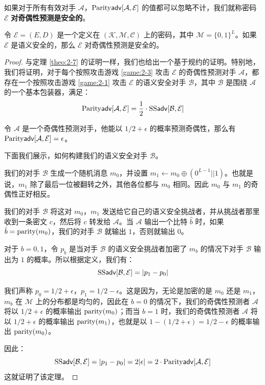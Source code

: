\begin{definition}[奇偶性预测]
如果对于所有有效对手 $\mathcal{A}$，${\rm Parity\mathsf{adv}}[\mathcal{A},\mathcal{E}]$ 的值都可以忽略不计，我们就称密码 $\mathcal{E}$ \textbf{对奇偶性预测是安全的}。
\end{definition}

\begin{theorem}
令 $\mathcal{E}=(E,D)$ 是一个定义在 $(\mathcal{K},\mathcal{M},\mathcal{C})$ 上的密码，其中 $\mathcal{M}=\{0,1\}^L$。如果 $\mathcal{E}$ 是语义安全的，那么 $\mathcal{E}$ 对奇偶性预测是安全的。
\end{theorem}

\begin{proof}
与定理 \ref{theo:2-7} 的证明一样，我们也给出一个基于规约的证明。特别地，我们将证明，对于每个按照攻击游戏 \ref{game:2-3} 攻击 $\mathcal{E}$ 的奇偶性预测对手 $\mathcal{A}$，都存在一个按照攻击游戏 \ref{game:2-1} 攻击 $\mathcal{E}$ 的语义安全对手 $\mathcal{B}$，其中 $\mathcal{B}$ 是围绕 $\mathcal{A}$ 的一个基本包装器，满足：
$$
{\rm Parity\mathsf{adv}}[\mathcal{A},\mathcal{E}]=\frac{1}{2}\cdot{\rm SS\mathsf{adv}}[\mathcal{B},\mathcal{E}]
$$

令 $\mathcal{A}$ 是一个奇偶性预测对手，他能以 ${1}/{2}+\epsilon$ 的概率预测奇偶性，那么有 ${\rm Parity\mathsf{adv}}[\mathcal{A},\mathcal{E}]=\epsilon$。

下面我们展示，如何构建我们的语义安全对手 $\mathcal{B}$。

我们的对手 $\mathcal{B}$ 生成一个随机消息 $m_0$，并设置 $m_1\leftarrow m_0\oplus(0^{L-1}||1)$。也就是说，$m_1$ 除了最后一位被翻转之外，其他各位都与 $m_0$ 相同。因此 $m_0$ 与 $m_1$ 的奇偶性正好相反。

我们的对手 $\mathcal{B}$ 将这对 $m_0$，$m_1$ 发送给它自己的语义安全挑战者，并从挑战者那里收到一条密文 $c$，然后将 $c$ 转发给 $\mathcal{A}$。当 $\mathcal{A}$ 输出一个比特 $\hat b$ 时，如果 $\hat b={\rm parity}(m_0)$，我们的对手 $\mathcal{B}$ 就输出 $1$，否则就输出 $0$。

对于 $b=0,1$，令 $p_b$ 是当对手 $\mathcal{B}$ 的语义安全挑战者加密了 $m_b$ 的情况下对手 $\mathcal{B}$ 输出为 $1$ 的概率。所以根据定义，我们有：
$$
{\rm SS\mathsf{adv}}[\mathcal{B},\mathcal{E}]=|p_1-p_0|
$$

我们声称 $p_0={1}/{2}+\epsilon$，$p_1={1}/{2}-\epsilon$。这是因为，无论是加密的是 $m_0$ 还是 $m_1$，$m_b$ 在 $\mathcal{M}$ 上的分布都是均匀的，因此在 $b=0$ 的情况下，我们的奇偶性预测者 $\mathcal{A}$ 将以 ${1}/{2}+\epsilon$ 的概率输出 ${\rm parity}(m_0)$；而当 $b=1$ 时，我们的奇偶性预测者 $\mathcal{A}$ 将以 ${1}/{2}+\epsilon$ 的概率输出 ${\rm parity}(m_1)$，也就是以 $1-({1}/{2}+\epsilon)={1}/{2}-\epsilon$ 的概率输出 ${\rm parity}(m_0)$。

因此：
$$
{\rm SS\mathsf{adv}}[\mathcal{B},\mathcal{E}]=|p_1-p_0|=2|\epsilon|=2\cdot{\rm Parity\mathsf{adv}}[\mathcal{A},\mathcal{E}]
$$
这就证明了该定理。
\end{proof}

